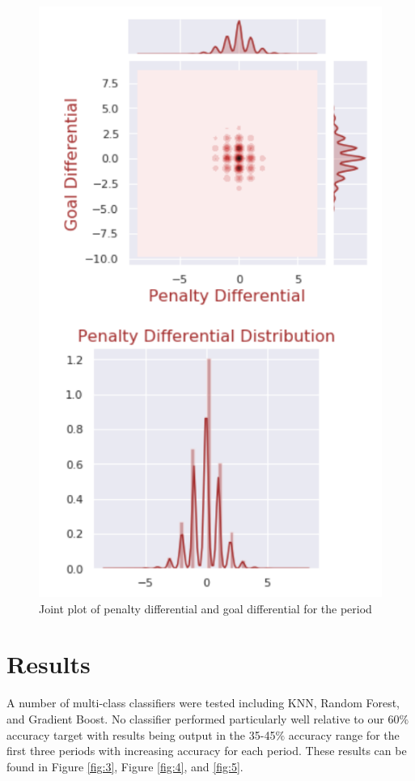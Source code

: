 \documentclass[twocolumn,letterpaper,12pt,notitlepage]{article}
\begin{document}
\begin{figure}[htp]
\centering
\includegraphics[width=\linewidth]{joint}
\caption{Joint plot of penalty differential and goal differential for the period}
\label{fig:2}
\end{figure}


\section{Results}
A number of multi-class classifiers were tested including KNN, Random Forest, and Gradient Boost.  No classifier performed particularly well relative to our 60$\%$ accuracy target with results being output in the 35-45$\%$ accuracy range for the first three periods with increasing accuracy for each period. These results can be found in Figure \ref{fig:3}, Figure \ref{fig:4}, and \ref{fig:5}.
\end{document}
